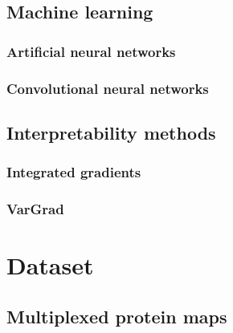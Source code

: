 \documentclass[biblatexBackend=bibtex]{tumthesis}
\begin{document}
\section{Machine learning}

\label{sec:basics:ML}
\subsection{Artificial neural networks}

\label{sec:basics:ANN}

\subsection{Convolutional neural networks}
\label{sec:basics:CNN}


\section{Interpretability methods}
\label{sec:basics:interpretability_methods}


\subsection{Integrated gradients}
\label{sec:basics:IG}


\subsection{VarGrad}
\label{sec:basics:VarGrad}



\chapter{Dataset}
\label{ch:dataset}


\section{Multiplexed protein maps}
\label{sec:dataset:multiplexed_protein_maps}

\end{document}
